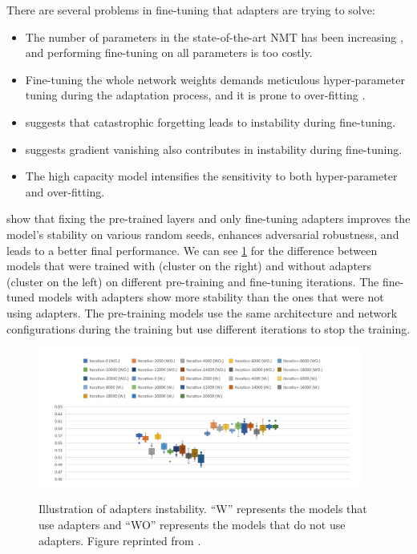 There are several problems in fine-tuning that adapters are trying to solve:
\begin{itemize}
    \item The number of parameters in the state-of-the-art NMT has been increasing , and performing fine-tuning on all parameters is too costly.
    \item Fine-tuning the whole network weights demands meticulous hyper-parameter tuning during the adaptation process, and it is prone to over-fitting .
    \item {} suggests that catastrophic forgetting leads to instability during fine-tuning.
    \item {} suggests gradient vanishing also contributes in instability during fine-tuning.
    \item The high capacity model intensifies the sensitivity to both hyper-parameter and over-fitting.
\end{itemize}

 show that fixing the pre-trained layers and only fine-tuning adapters improves the model's stability on various random seeds, enhances adversarial robustness, and leads to a better final performance. We can see \cref{img:adapters_instability} for the difference between models that were trained with (cluster on the right) and without adapters (cluster on the left) on different pre-training and fine-tuning iterations. The fine-tuned models with adapters show more stability than the ones that were not using adapters. The pre-training models use the same architecture and network configurations during the training but use different iterations to stop the training.

\begin{figure}[h]
    {\includegraphics[width=0.95\textwidth]{img/adapters_instability.png}}
    \centering
    \caption{Illustration of adapters instability. ``W'' represents the models that use adapters and ``WO'' represents the models that do not use adapters. Figure reprinted from \cite{han2021robust}.}
    \label{img:adapters_instability}
\end{figure}